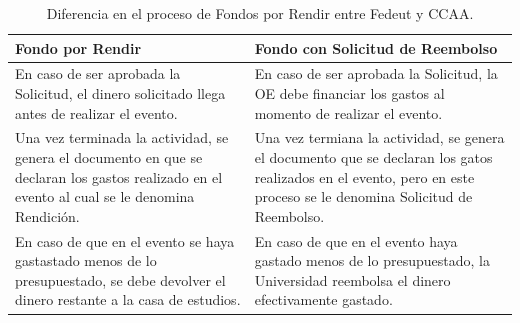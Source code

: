 \begin{table}[htbp]
    
    \caption{\label{tab: tab_dif_proc_FpR_FcSR} Diferencia en el proceso de Fondos por Rendir entre Fedeut y CCAA. }
    \footnotesize
    \begin{tabular}{|p{7.1cm}|p{7.1cm}|}
    
    \hline
    \textbf{Fondo por Rendir} & \textbf{Fondo con Solicitud de Reembolso} \\
    
    \hline\hline
    
    En caso de ser aprobada la Solicitud, el dinero solicitado llega antes de realizar el evento. & En caso de ser aprobada la Solicitud, la OE debe financiar los gastos al momento de realizar el evento.\\ \hline

    Una vez terminada la actividad, se genera el documento en que se declaran los gastos realizado en el evento al cual se le denomina Rendición. & Una vez termiana la actividad, se genera el documento que se declaran los gatos realizados en el evento, pero en este proceso se le denomina Solicitud de Reembolso.\\ \hline

    En caso de que en el evento se haya gastastado menos de lo presupuestado, se debe devolver el dinero restante a la casa de estudios. & En caso de que en el evento haya gastado menos de lo presupuestado, la Universidad reembolsa el dinero efectivamente gastado.\\ \hline

    \end{tabular}  
\end{table}